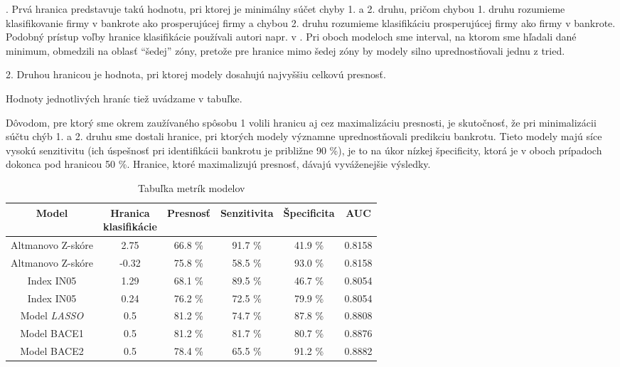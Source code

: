 .	Prvá hranica predstavuje takú hodnotu, pri ktorej je minimálny súčet chyby 1. a 2. druhu, pričom chybou 1. druhu rozumieme klasifikovanie firmy v bankrote ako prosperujúcej firmy a chybou 2. druhu
rozumieme klasifikáciu prosperujúcej firmy ako firmy v bankrote.
Podobný prístup voľby hranice klasifikácie používali autori napr. v \cite{boda, begley, wu}.
Pri oboch modeloch sme interval, na ktorom sme hľadali dané minimum, obmedzili na oblasť “šedej” zóny, pretože pre hranice mimo šedej zóny by modely silno uprednostňovali jednu z tried.

2.	Druhou hranicou je hodnota, pri ktorej modely dosahujú najvyššiu celkovú presnosť.

Hodnoty jednotlivých hraníc tiež uvádzame v tabuľke.

Dôvodom, pre ktorý sme okrem zaužívaného spôsobu 1 volili hranicu aj cez maximalizáciu presnosti, je skutočnosť, že pri minimalizácii súčtu chýb 1. a 2. druhu sme dostali hranice,
pri ktorých modely významne uprednostňovali predikciu bankrotu.
Tieto modely majú síce vysokú senzitivitu (ich úspešnosť pri identifikácii bankrotu je približne 90 \%), je to na úkor nízkej špecificity, ktorá je v oboch prípadoch dokonca pod hranicou 50 \%.
Hranice, ktoré maximalizujú presnosť, dávajú vyváženejšie výsledky.

\bigskip

\begin{table}
    \begin{tabular}{ cc|cccc }
        Model & \makecell{Hranica \\ klasifikácie} & Presnosť & Senzitivita & Špecificita & AUC \\
        \hline
        Altmanovo Z-skóre & 2.75 & 66.8 \% & 91.7 \% & 41.9 \% & 0.8158 \\
        Altmanovo Z-skóre & -0.32 & 75.8 \% & 58.5 \% & 93.0 \% & 0.8158 \\
        Index IN05 & 1.29 & 68.1 \% & 89.5 \% & 46.7 \% & 0.8054 \\
        Index IN05 & 0.24 & 76.2 \% & 72.5 \% & 79.9 \% & 0.8054 \\
        Model \emph{LASSO} & 0.5 & 81.2 \% & 74.7 \% & 87.8 \% & 0.8808 \\
        Model BACE1 & 0.5 & 81.2 \% & 81.7 \% & 80.7 \% & 0.8876 \\
        Model BACE2 & 0.5 & 78.4 \% & 65.5 \% & 91.2 \% & 0.8882 \\
    \end{tabular}
    \caption{Tabuľka metrík modelov}
    \label{tabulka_metrik}
\end{table}

